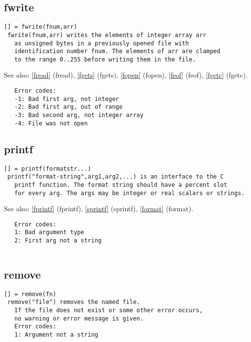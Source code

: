 \documentclass[a4paper]{article}
\begin{document}
\subsection{fwrite\label{fwrite}}

\begin{tscreen}
\begin{verbatim}
[] = fwrite(fnum,arr)
 fwrite(fnum,arr) writes the elements of integer array arr
   as unsigned bytes in a previously opened file with
   identification number fnum. The elements of arr are clamped
   to the range 0..255 before writing them in the file.
\end{verbatim}

See also: \ref{fread} {(fread)}, \ref{fgets} {(fgets)}, \ref{fopen} {(fopen)}, \ref{feof} {(feof)}, \ref{fgetc} {(fgetc)}.
\begin{verbatim}
   Error codes:
   -1: Bad first arg, not integer
   -2: Bad first arg, out of range
   -3: Bad second arg, not integer array
   -4: File was not open
\end{verbatim}
\end{tscreen}



\subsection{printf\label{printf}}

\begin{tscreen}
\begin{verbatim}
[] = printf(formatstr...)
 printf("format-string",arg1,arg2,...) is an interface to the C
   printf function. The format string should have a percent slot
   for every arg. The args may be integer or real scalars or strings.
\end{verbatim}

See also: \ref{fprintf} {(fprintf)}, \ref{sprintf} {(sprintf)}, \ref{format} {(format)}.
\begin{verbatim}
   Error codes:
   1: Bad argument type
   2: First arg not a string
   
\end{verbatim}
\end{tscreen}



\subsection{remove\label{remove}}

\begin{tscreen}
\begin{verbatim}
[] = remove(fn)
 remove("file") removes the named file.
   If the file does not exist or some other error occurs,
   no warning or error message is given.
   Error codes:
   1: Argument not a string
   
\end{verbatim}
\end{tscreen}
\end{document}
